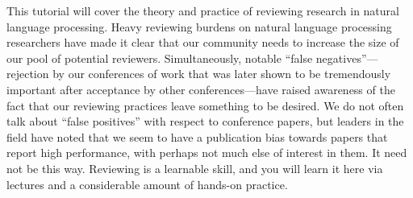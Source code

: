 This tutorial will cover the theory and practice of reviewing research in natural language processing. Heavy reviewing burdens on natural language processing researchers have made it clear that our community needs to increase the size of our pool of potential reviewers. Simultaneously, notable ``false negatives''---rejection by our conferences of work that was later shown to be tremendously important after acceptance by other conferences---have raised awareness of the fact that our reviewing practices leave something to be desired. We do not often talk about ``false positives'' with respect to conference papers, but leaders in the field have noted that we seem to have a publication bias towards papers that report high performance, with perhaps not much else of interest in them. It need not be this way. Reviewing is a learnable skill, and you will learn it here via lectures and a considerable amount of hands-on practice.
